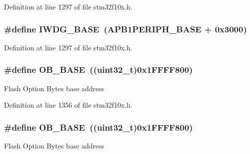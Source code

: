 Definition at line 1297 of file stm32f10x.\+h.

\subsubsection[{\texorpdfstring{I\+W\+D\+G\+\_\+\+B\+A\+SE}{IWDG_BASE}}]{\setlength{\rightskip}{0pt plus 5cm}\#define I\+W\+D\+G\+\_\+\+B\+A\+SE~({\bf A\+P\+B1\+P\+E\+R\+I\+P\+H\+\_\+\+B\+A\+SE} + 0x3000)}\hypertarget{group___peripheral__memory__map_ga8543ee4997296af5536b007cd4748f55}{}\label{group___peripheral__memory__map_ga8543ee4997296af5536b007cd4748f55}


Definition at line 1297 of file stm32f10x.\+h.

\subsubsection[{\texorpdfstring{O\+B\+\_\+\+B\+A\+SE}{OB_BASE}}]{\setlength{\rightskip}{0pt plus 5cm}\#define O\+B\+\_\+\+B\+A\+SE~(({\bf uint32\+\_\+t})0x1\+F\+F\+F\+F800)}\hypertarget{group___peripheral__memory__map_gab5b5fb155f9ee15dfb6d757da1adc926}{}\label{group___peripheral__memory__map_gab5b5fb155f9ee15dfb6d757da1adc926}
Flash Option Bytes base address 

Definition at line 1356 of file stm32f10x.\+h.

\subsubsection[{\texorpdfstring{O\+B\+\_\+\+B\+A\+SE}{OB_BASE}}]{\setlength{\rightskip}{0pt plus 5cm}\#define O\+B\+\_\+\+B\+A\+SE~(({\bf uint32\+\_\+t})0x1\+F\+F\+F\+F800)}\hypertarget{group___peripheral__memory__map_gab5b5fb155f9ee15dfb6d757da1adc926}{}\label{group___peripheral__memory__map_gab5b5fb155f9ee15dfb6d757da1adc926}
Flash Option Bytes base address 

